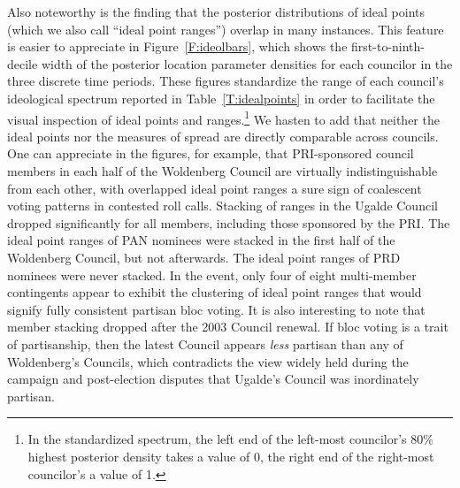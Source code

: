 \documentclass[12 pt, letter]{article}
\begin{document}
Also noteworthy is the finding that the posterior distributions of
ideal points (which we also call ``ideal point ranges'') overlap in
many instances.  This feature is easier to appreciate in
Figure~\ref{F:ideolbars}, which shows the first-to-ninth-decile
width of the posterior location parameter densities for each
councilor in the three discrete time periods. These figures
standardize the range of each council's ideological spectrum
reported in Table~\ref{T:idealpoints} in order to facilitate the
visual inspection of ideal points and ranges.\footnote{In the
standardized spectrum, the left end of the left-most councilor's
80\% highest posterior density takes a value of 0, the right end of
the right-most councilor's a value of 1.}  We hasten to add that
neither the ideal points nor the measures of spread are directly
comparable across councils.  One can appreciate in the figures, for
example, that PRI-sponsored council members in each half of the
Woldenberg Council are virtually indistinguishable from each other,
with overlapped ideal point ranges a sure sign of coalescent voting
patterns in contested roll calls. Stacking of ranges in the Ugalde
Council dropped significantly for all members, including those
sponsored by the PRI.  The ideal point ranges of  PAN nominees were
stacked in the first half of the Woldenberg Council, but not
afterwards. The ideal point ranges of PRD nominees  were never
stacked. In the event, only four of eight multi-member contingents
appear to exhibit the clustering of ideal point ranges that would
signify fully consistent partisan bloc voting.  It is also
interesting to note that member stacking dropped after the 2003
Council renewal. If bloc voting is a trait of partisanship, then the
latest Council appears \emph{less} partisan than any of Woldenberg's
Councils, which contradicts the view widely held during the campaign
and post-election disputes that Ugalde's Council was inordinately
partisan.
\end{document}

